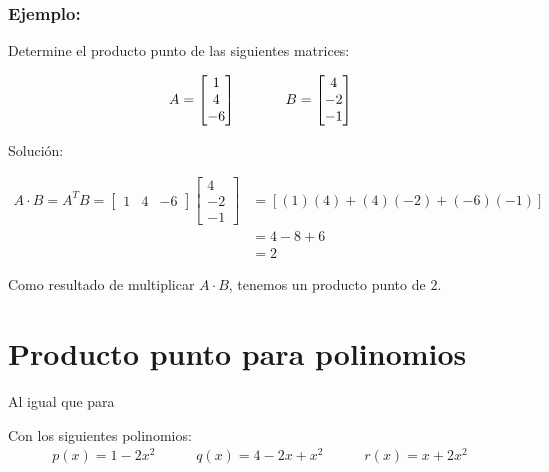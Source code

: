 \documentclass{article}
\begin{document}
    \subsubsection*{Ejemplo:}

    Determine el producto punto de las siguientes matrices:

    \begin{gather*}
        A = \begin{bmatrix}
            1  \\
            4  \\
            -6
        \end{bmatrix} \hspace{35 pt}
        B = \begin{bmatrix}
            4  \\
            -2 \\
            -1
        \end{bmatrix}
    \end{gather*}

    Solución:

    \begin{equation*}
        \begin{aligned}
            A \cdot B = A^TB = \begin{bmatrix}
                1 & 4 & -6
            \end{bmatrix} \begin{bmatrix}
                4 \\
                -2 \\
                -1
            \end{bmatrix}
            &=[(1)(4) + (4)(-2) + (-6)(-1)] \\
            &=4-8+6 \\
            &=2
        \end{aligned}
    \end{equation*}

    Como resultado de multiplicar $A \cdot B$, tenemos un producto punto de $2$.

\section{Producto punto para polinomios}

    Al igual que para 

    Con los siguientes polinomios:
    \begin{gather*}
        p(x)=1-2x^{2}\hspace{35pt}q(x)=4-2x+x^{2}\hspace{35pt}r(x)=x+2x^{2}
    \end{gather*}
\end{document}

